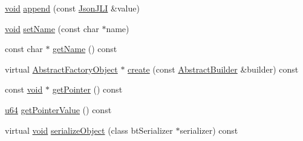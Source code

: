 \begin{DoxyCompactItemize}
\item 
\mbox{\hyperlink{_thread_8h_af1e856da2e658414cb2456cb6f7ebc66}{void}} \mbox{\hyperlink{classnjli_1_1_json_j_l_i_a39309cbcc85b3fc8afc9f16983f71db4}{append}} (const \mbox{\hyperlink{classnjli_1_1_json_j_l_i}{Json\+J\+LI}} \&value)
\item 
\mbox{\hyperlink{_thread_8h_af1e856da2e658414cb2456cb6f7ebc66}{void}} \mbox{\hyperlink{classnjli_1_1_json_j_l_i_a087eb5f8d9f51cc476f12f1d10a3cb95}{set\+Name}} (const char $\ast$name)
\item 
const char $\ast$ \mbox{\hyperlink{classnjli_1_1_json_j_l_i_ad41266885be835f3ee602311e20877a4}{get\+Name}} () const
\item 
virtual \mbox{\hyperlink{classnjli_1_1_abstract_factory_object}{Abstract\+Factory\+Object}} $\ast$ \mbox{\hyperlink{classnjli_1_1_json_j_l_i_a83a8876ae63b92804004cf3febe76573}{create}} (const \mbox{\hyperlink{classnjli_1_1_abstract_builder}{Abstract\+Builder}} \&builder) const
\item 
const \mbox{\hyperlink{_thread_8h_af1e856da2e658414cb2456cb6f7ebc66}{void}} $\ast$ \mbox{\hyperlink{classnjli_1_1_json_j_l_i_ac4ca71716ed832be357f15f8262c8448}{get\+Pointer}} () const
\item 
\mbox{\hyperlink{_util_8h_ad758b7a5c3f18ed79d2fcd23d9f16357}{u64}} \mbox{\hyperlink{classnjli_1_1_json_j_l_i_a4ffddf141a426a5a07d0ac19f1913811}{get\+Pointer\+Value}} () const
\item 
virtual \mbox{\hyperlink{_thread_8h_af1e856da2e658414cb2456cb6f7ebc66}{void}} \mbox{\hyperlink{classnjli_1_1_json_j_l_i_a4fc4bcd9d1930911474210c047372fc0}{serialize\+Object}} (class bt\+Serializer $\ast$serializer) const
\end{DoxyCompactItemize}
